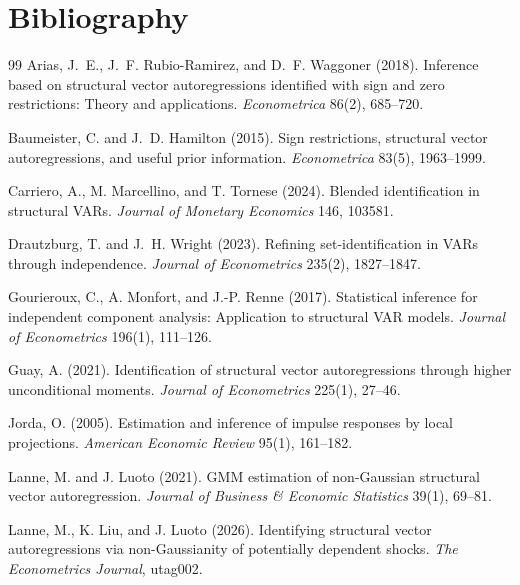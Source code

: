 \documentclass[11pt]{article}
\theoremstyle{definition}
\theoremstyle{plain}
\theoremstyle{remark}
\begin{document}
\section*{Bibliography}
\begin{thebibliography}{99}
Arias, J.~E., J.~F. Rubio-Ramirez, and D.~F. Waggoner (2018).
Inference based on structural vector autoregressions identified with sign and zero restrictions: Theory and applications.
\emph{Econometrica} 86(2), 685--720.

Baumeister, C. and J.~D. Hamilton (2015).
Sign restrictions, structural vector autoregressions, and useful prior information.
\emph{Econometrica} 83(5), 1963--1999.

Carriero, A., M. Marcellino, and T. Tornese (2024).
Blended identification in structural VARs.
\emph{Journal of Monetary Economics} 146, 103581.

Drautzburg, T. and J.~H. Wright (2023).
Refining set-identification in VARs through independence.
\emph{Journal of Econometrics} 235(2), 1827--1847.

Gourieroux, C., A. Monfort, and J.-P. Renne (2017).
Statistical inference for independent component analysis: Application to structural VAR models.
\emph{Journal of Econometrics} 196(1), 111--126.

Guay, A. (2021).
Identification of structural vector autoregressions through higher unconditional moments.
\emph{Journal of Econometrics} 225(1), 27--46.

Jorda, O. (2005).
Estimation and inference of impulse responses by local projections.
\emph{American Economic Review} 95(1), 161--182.

Lanne, M. and J. Luoto (2021).
GMM estimation of non-Gaussian structural vector autoregression.
\emph{Journal of Business \& Economic Statistics} 39(1), 69--81.

Lanne, M., K. Liu, and J. Luoto (2026).
Identifying structural vector autoregressions via non-Gaussianity of potentially dependent shocks.
\emph{The Econometrics Journal}, utag002.


\end{thebibliography}
\end{document}

